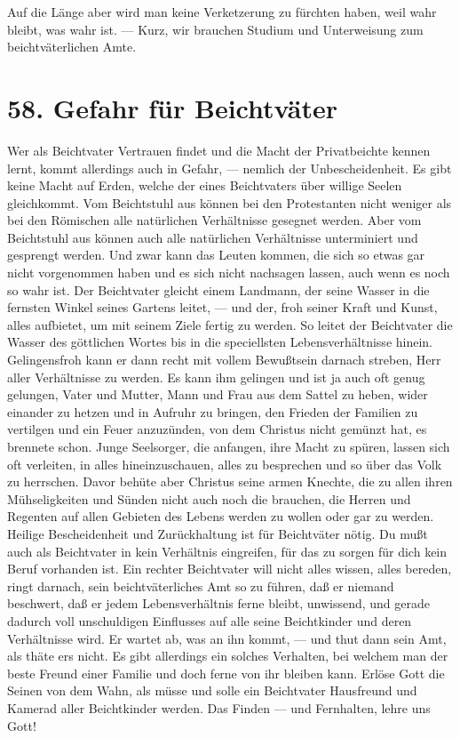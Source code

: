 Auf die Länge aber wird man keine Verketzerung zu fürchten haben, weil wahr bleibt, was wahr ist. — Kurz, wir brauchen Studium und Unterweisung zum beichtväterlichen Amte.

\section{58. Gefahr für Beichtväter}

Wer als Beichtvater Vertrauen findet und die Macht der Privatbeichte kennen lernt, kommt allerdings auch in Gefahr, — nemlich der Unbescheidenheit. Es gibt keine Macht auf Erden, welche der eines Beichtvaters über willige Seelen gleichkommt. Vom Beichtstuhl aus können bei den Protestanten nicht weniger als bei den Römischen alle natürlichen Verhältnisse gesegnet werden. Aber vom Beichtstuhl aus können auch alle natürlichen Verhältnisse unterminiert und gesprengt werden. Und zwar kann das Leuten kommen, die sich so etwas gar nicht vorgenommen haben und es sich nicht nachsagen lassen, auch wenn es noch so wahr ist. Der Beichtvater gleicht einem Landmann, der seine Wasser in die fernsten Winkel seines Gartens leitet, — und der, froh seiner Kraft und Kunst, alles aufbietet, um mit seinem Ziele fertig zu werden. So leitet der Beichtvater die Wasser des göttlichen Wortes bis in die speciellsten Lebensverhältnisse hinein. Gelingensfroh kann er dann recht mit vollem Bewußtsein darnach streben, Herr aller Verhältnisse zu werden. Es kann ihm gelingen und ist ja auch oft genug gelungen, Vater und Mutter, Mann und Frau aus dem Sattel zu heben, wider einander zu hetzen und in Aufruhr zu bringen, den Frieden der Familien zu vertilgen und ein Feuer anzuzünden, von dem
Christus nicht gemünzt hat, es brennete schon. Junge Seelsorger, die anfangen, ihre Macht zu spüren, lassen sich oft verleiten, in alles hineinzuschauen, alles zu besprechen und so über das Volk zu herrschen. Davor behüte aber Christus seine armen Knechte, die zu allen ihren Mühseligkeiten und Sünden nicht auch noch die brauchen, die Herren und Regenten auf allen Gebieten des Lebens werden zu wollen oder gar zu werden. Heilige Bescheidenheit und Zurückhaltung ist für Beichtväter nötig. Du mußt auch als Beichtvater in kein Verhältnis eingreifen, für das zu sorgen für dich kein Beruf vorhanden ist. Ein rechter Beichtvater will nicht alles wissen, alles bereden, ringt darnach, sein beichtväterliches Amt so zu führen, daß er niemand beschwert, daß er jedem Lebensverhältnis ferne bleibt, unwissend, und gerade dadurch voll unschuldigen Einflusses auf alle seine Beichtkinder und deren Verhältnisse wird. Er wartet ab, was an ihn kommt, — und thut dann sein Amt, als thäte ers nicht. Es gibt allerdings ein solches Verhalten, bei welchem man der beste Freund einer Familie und doch ferne von ihr bleiben kann. Erlöse Gott die Seinen von dem Wahn, als müsse und solle ein Beichtvater Hausfreund und Kamerad aller Beichtkinder werden. Das Finden — und Fernhalten, lehre uns Gott!

